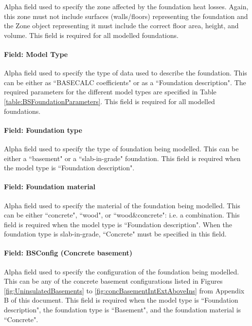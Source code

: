 Alpha field used to specify the zone affected by the foundation heat losses. Again, this zone must not include surfaces (walls/floors) representing the foundation and the Zone object representing it must include the correct floor area, height, and volume.  This field is required for all modelled foundations.

\paragraph{Field: Model Type}\label{field-modeltype-basesimp}

Alpha field used to specify the type of data used to describe the foundation.  This can be either as ``BASECALC coefficients" or as a ``Foundation description".  The required parameters for the different model types are specified in Table \ref{table:BSFoundationParameters}.  This field is required for all modelled foundations.

\paragraph{Field: Foundation type}\label{field-foundationtype-basesimp}

Alpha field used to specify the type of foundation being modelled.  This can be either a ``basement" or a ``slab-in-grade" foundation.  This field is required when the model type is ``Foundation description".

\paragraph{Field: Foundation material}\label{field-foundationmaterial-basesimp}

Alpha field used to specify the material of the foundation being modelled.  This can be either ``concrete", ``wood", or ``wood\&concrete": i.e. a combination.  This field is required when the model type is ``Foundation description".  When the foundation type is slab-in-grade, ``Concrete" must be specified in this field.

\paragraph{Field: BSConfig (Concrete basement)}\label{field-configconcbasement-basesimp}

Alpha field used to specify the configuration of the foundation being modelled.  This can be any of the concrete basement configurations listed in Figures \ref{fig:UninsulatedBasements} to \ref{fig:concBasementIntExtAboveIns} from Appendix B of this document.  This field is required when the model type is ``Foundation description", the foundation type is ``Basement", and the foundation material is ``Concrete".

